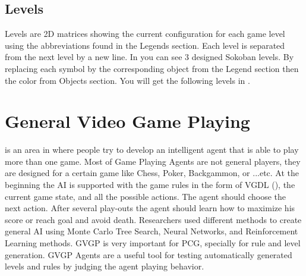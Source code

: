 \subsection{Levels}
Levels are 2D matrices showing the current configuration for each game level using the abbreviations found in the Legends section. Each level is separated from the next level by a new line. In  you can see 3 designed Sokoban levels. By replacing each symbol by the corresponding object from the Legend section then the color from Objects section. You will get the following levels in . 

\section{General Video Game Playing}
 is an area in  where people try to develop an intelligent agent that is able to play more than one game. Most of Game Playing Agents are not general players, they are designed for a certain game like Chess, Poker, Backgammon, or ...etc. At the beginning the AI is supported with the game rules in the form of VGDL (), the current game state, and all the possible actions. The agent should choose the next action. After several play-outs the agent should learn how to maximize his score or reach goal and avoid death. Researchers used different methods to create general AI using Monte Carlo Tree Search, Neural Networks, and Reinforcement Learning methods. GVGP is very important for PCG, specially for rule and level generation. GVGP Agents are a useful tool for testing automatically generated levels and rules by judging the agent playing behavior.\cite{gvgp}
